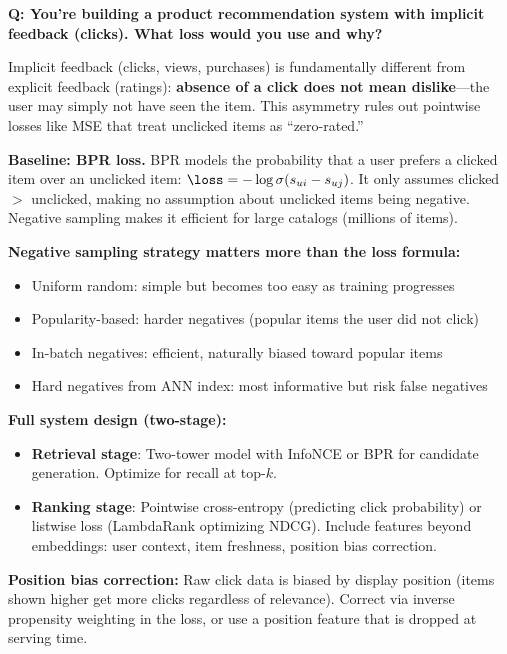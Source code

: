 \begin{interviewq}
\textbf{Q: You're building a product recommendation system with implicit feedback (clicks). What loss would you use and why?}

 \quad {} \quad \badgefreq{\freqhigh}

\stronganswer Implicit feedback (clicks, views, purchases) is fundamentally different from explicit feedback (ratings): \textbf{absence of a click does not mean dislike}---the user may simply not have seen the item. This asymmetry rules out pointwise losses like MSE that treat unclicked items as ``zero-rated.''

\textbf{Baseline: BPR loss.} BPR models the probability that a user prefers a clicked item over an unclicked item: $\loss = -\log\sigma(s_{ui} - s_{uj})$. It only assumes clicked $>$ unclicked, making no assumption about unclicked items being negative. Negative sampling makes it efficient for large catalogs (millions of items).

\textbf{Negative sampling strategy matters more than the loss formula:}
\begin{itemize}
    \item Uniform random: simple but becomes too easy as training progresses
    \item Popularity-based: harder negatives (popular items the user did not click)
    \item In-batch negatives: efficient, naturally biased toward popular items
    \item Hard negatives from ANN index: most informative but risk false negatives
\end{itemize}

\textbf{Full system design (two-stage):}
\begin{itemize}
    \item \textbf{Retrieval stage}: Two-tower model with InfoNCE or BPR for candidate generation. Optimize for recall at top-$k$.
    \item \textbf{Ranking stage}: Pointwise cross-entropy (predicting click probability) or listwise loss (LambdaRank optimizing NDCG). Include features beyond embeddings: user context, item freshness, position bias correction.
\end{itemize}

\textbf{Position bias correction:} Raw click data is biased by display position (items shown higher get more clicks regardless of relevance). Correct via inverse propensity weighting in the loss, or use a position feature that is dropped at serving time.


\end{interviewq}
